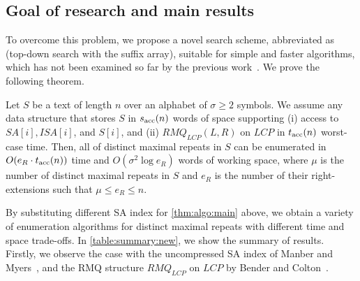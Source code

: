 \subsection{Goal of research and main results} 
To overcome this problem, we propose a novel search scheme, abbreviated as \TDSA{} (top-down search with the suffix array), suitable for simple and faster algorithms, which has not been examined so far by the previous work~\cite{narisawa2007efficient,beller:berger2012space:efficient:bbo,belazzougui2020linear,nishimoto:cpm2021enum}.  
We prove the following theorem.


\begin{theorem}\label{thm:algo:main}
  Let $S$ be a text of length $n$ over an alphabet of $\sigma\ge 2$ symbols.
  We assume any data structure that stores $S$ in $s_{\mathrm{acc}}(n)$ words of space supporting (i) access to $SA[i], ISA[i]$, and $S[i]$, and (ii) $RMQ_{LCP}(L, R)$ on $LCP$ in $t_{\mathrm{acc}}(n)$ worst-case time.
Then, all of distinct maximal repeats in $S$ can be enumerated in $O(e_R\cdot t_{\mathrm{acc}}(n))$ time and $O(\sigma^2 \log e_R)$ words of working space, where $\mu$ is the number of distinct maximal repeats in $S$ and  $e_R$ is the number of their right-extensions such that $\mu \le e_R \le n$. 
\end{theorem}

By substituting different SA index for \cref{thm:algo:main} above, we obtain a variety of enumeration algorithms for distinct maximal repeats with different time and space trade-offs.
In \cref{table:summary:new}, we show the summary of results. 
Firstly, we observe the case with the uncompressed SA index of Manber and Myers~\cite{manber:myers1993suffixarrays}, and the RMQ structure $RMQ_{LCP}$ on $LCP$ by Bender and Colton~\cite{bender:colton2000thelcaproblem}. 

